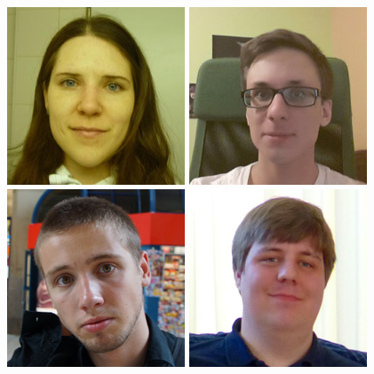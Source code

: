 \includegraphics[width=.2\linewidth]{img/fsr/200_anita_gruetzner.jpg}
\includegraphics[width=.2\linewidth]{img/fsr/200_justus_adam.jpg}
\includegraphics[width=.2\linewidth]{img/fsr/200_manuel_thieme.jpg}
\includegraphics[width=.2\linewidth]{img/fsr/200_sascha_peukert.jpg}

